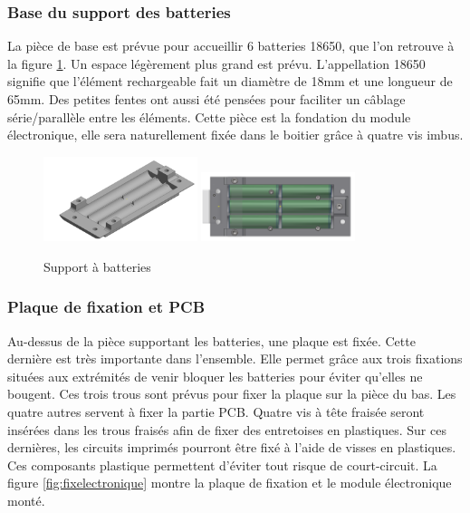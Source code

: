 \subsubsection{Base du support des batteries}

La pièce de base est prévue pour accueillir 6 batteries 18650, que l'on retrouve à la figure \ref{fig:supportbatteries}.
Un espace légèrement plus grand est 
prévu. L’appellation 18650 signifie que l’élément rechargeable fait un diamètre de 18mm et une longueur 
de 65mm. Des petites fentes ont aussi été pensées pour faciliter un câblage série/parallèle entre les 
éléments. Cette pièce est la fondation du module électronique, elle sera naturellement fixée dans le 
boitier grâce à quatre vis imbus.

\begin{figure}[H]
    \centering
    \includegraphics[width=0.4\textwidth]{Images/photos_PGA/moduleFondbat.PNG}
    \includegraphics[width=0.4\textwidth]{Images/photos_PGA/bateriebl.PNG}
    \caption{Support à batteries}
    \label{fig:supportbatteries}
\end{figure}

\subsubsection{Plaque de fixation et PCB}

Au-dessus de la pièce supportant les batteries, une plaque est fixée. Cette dernière est très importante 
dans l’ensemble. Elle permet grâce aux trois fixations situées aux extrémités de venir bloquer les batteries 
pour éviter qu'elles ne bougent. Ces trois trous sont prévus pour fixer la plaque 
sur la pièce du bas. Les quatre autres servent à fixer la partie PCB. Quatre vis à tête fraisée seront 
insérées dans les trous fraisés afin de fixer des entretoises en plastiques. Sur ces dernières, 
les circuits imprimés pourront être fixé à l’aide de visses en plastiques. Ces composants 
plastique permettent d’éviter tout risque de court-circuit. La figure \ref{fig:fixelectronique} montre la plaque
de fixation et le module électronique monté.

